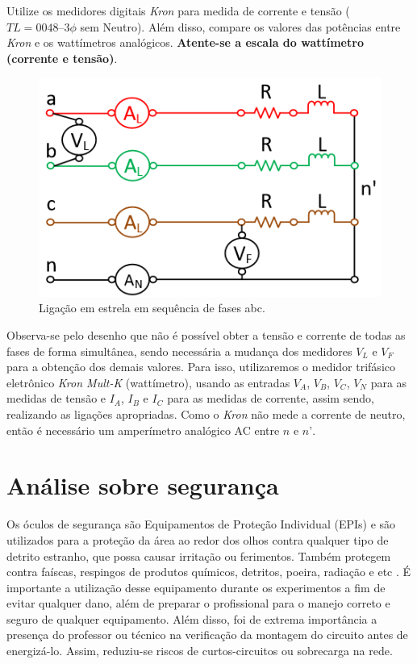 \documentclass[a4paper,12pt,oneside,openany,table,xcdraw]{article}
\begin{document}
Utilize os medidores digitais \emph{Kron} para medida de corrente e tensão ($TL = 0048 – 3\phi$ sem Neutro). Além disso, compare os valores das potências entre \emph{Kron} e os wattímetros analógicos. \textbf{Atente-se a escala do wattímetro (corrente e tensão)}. 
\begin{figure}[H]
\centering
\captionsetup{font=scriptsize}
\includegraphics[width=14cm]{fig1}
\caption{Ligação em estrela em sequência de fases abc.}
\label{fig1}
\end{figure}
Observa-se pelo desenho que não é possível obter a tensão e corrente de todas as fases de forma simultânea, sendo necessária a mudança dos medidores $V_L$ e $V_F$ para a obtenção dos demais valores. Para isso, utilizaremos o medidor trifásico eletrônico \textit{Kron Mult-K} (wattímetro),  usando as entradas $V_A$, $V_B$, $V_C$, $V_N$ para as medidas de tensão e $I_A$, $I_B$ e $I_C$ para as medidas de corrente, assim sendo, realizando as ligações apropriadas. Como o \textit{Kron} não mede a corrente de neutro, então é necessário um amperímetro analógico AC entre $n$ e $n’$.




\section{Análise sobre segurança} %
Os óculos de segurança são Equipamentos de Proteção Individual (EPIs) e são utilizados para a proteção da área ao redor dos olhos contra qualquer tipo de detrito estranho, que possa causar irritação ou ferimentos. Também protegem contra faíscas, respingos de produtos químicos, detritos, poeira, radiação e etc \cite{safe}.
É importante a utilização desse equipamento durante os experimentos a fim de evitar qualquer dano, além de preparar o profissional para o manejo correto e seguro de qualquer equipamento.
Além disso, foi de extrema importância a presença do professor ou técnico na verificação da montagem do circuito antes de energizá-lo. Assim, reduziu-se riscos de curtos-circuitos ou sobrecarga na rede.
\end{document}
